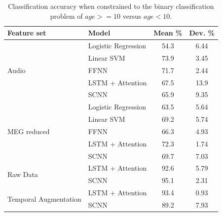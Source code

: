 \documentclass[fleqn,10pt]{wlscirep}
\begin{document}
\begin{table}[htp]
  \caption{Classification accuracy when constrained to the binary classification problem of $age >= 10$ versus $age < 10$.}
  \centering
  \begin{tabular}{l l | c | c}
    \toprule
    \textbf{Feature set} & \textbf{Model} & \textbf{Mean \%} & \textbf{Dev. \%} \\
    \toprule
    \multirow{5}{*}{Audio}
                         & Logistic Regression    & 54.3 & 6.44  \\
                         & Linear SVM             & 73.9 & 3.45  \\
                         & FFNN                   & 71.7 & 2.44  \\
                         & LSTM + Attention       & 67.5 & 13.9  \\
                         & SCNN                   & 65.9 & 9.35  \\
    \midrule
    \multirow{5}{*}{MEG reduced}
                         & Logistic Regression    & 63.5 & 5.64  \\
                         & Linear SVM             & 69.2 & 5.74  \\
                         & FFNN                   & 66.3 & 4.93  \\
                         & LSTM + Attention       & 72.3 & 1.74  \\
                         & SCNN                   & 69.7 & 7.03  \\
    
    \midrule
    \multirow{2}{*}{Raw Data}
                         & LSTM + Attention    & 92.6 & 5.79  \\ 
                         & SCNN                & 95.1 & 2.31  \\
    \midrule
    \multirow{2}{*}{Temporal Augmentation}
                         & LSTM + Attention    & 93.4 & 0.93  \\ 
                         & SCNN                & 89.2 & 7.93  \\
    
    \bottomrule
  \end{tabular}
  \label{tab:binary_results}
\end{table}
\end{document}
